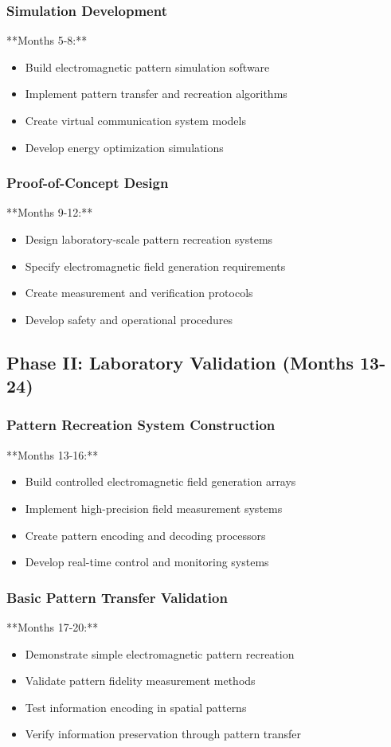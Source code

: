 \documentclass[12pt,a4paper]{article}
\begin{document}
\subsubsection{Simulation Development}
**Months 5-8:**
\begin{itemize}
\item Build electromagnetic pattern simulation software
\item Implement pattern transfer and recreation algorithms
\item Create virtual communication system models
\item Develop energy optimization simulations
\end{itemize}

\subsubsection{Proof-of-Concept Design}
**Months 9-12:**
\begin{itemize}
\item Design laboratory-scale pattern recreation systems
\item Specify electromagnetic field generation requirements
\item Create measurement and verification protocols
\item Develop safety and operational procedures
\end{itemize}

\subsection{Phase II: Laboratory Validation (Months 13-24)}

\subsubsection{Pattern Recreation System Construction}
**Months 13-16:**
\begin{itemize}
\item Build controlled electromagnetic field generation arrays
\item Implement high-precision field measurement systems
\item Create pattern encoding and decoding processors
\item Develop real-time control and monitoring systems
\end{itemize}

\subsubsection{Basic Pattern Transfer Validation}
**Months 17-20:**
\begin{itemize}
\item Demonstrate simple electromagnetic pattern recreation
\item Validate pattern fidelity measurement methods
\item Test information encoding in spatial patterns
\item Verify information preservation through pattern transfer
\end{itemize}
\end{document}
